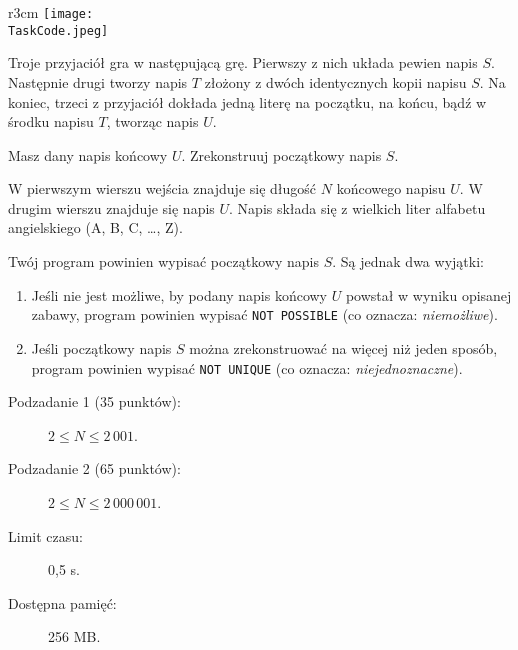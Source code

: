 \documentclass{boi2014-pl}
\renewcommand{\TaskCode}{friends}
\begin{document}
    \begin{wrapfigure}{r}{3cm}
		\texttt{[image: \\TaskCode.jpeg]}
	\end{wrapfigure}
    Troje przyjaciół gra w następującą grę.
    Pierwszy z nich układa pewien napis $S$.
    Następnie drugi tworzy napis $T$ złożony z dwóch identycznych kopii napisu $S$.
    Na koniec, trzeci z przyjaciół dokłada jedną literę na początku, na końcu, bądź w środku napisu $T$, tworząc napis $U$.

    \Task
    Masz dany napis końcowy $U$. Zrekonstruuj początkowy napis $S$.

    \Input
    W pierwszym wierszu wejścia znajduje się długość $N$ końcowego napisu $U$.
    W drugim wierszu znajduje się napis $U$.
    Napis składa się z wielkich liter alfabetu angielskiego (A, B, C, \ldots{}, Z).

    \Output
    Twój program powinien wypisać początkowy napis $S$.
    Są jednak dwa wyjątki:
    \begin{enumerate}
        \item Jeśli nie jest możliwe, by podany napis końcowy $U$ powstał w wyniku opisanej zabawy, program powinien wypisać {\tt NOT POSSIBLE}
          (co oznacza: \emph{niemożliwe}).
        \item Jeśli początkowy napis $S$ można zrekonstruować na więcej niż jeden sposób, program powinien wypisać {\tt NOT
          UNIQUE} (co oznacza: \emph{niejednoznaczne}).
    \end{enumerate}
    

    \Examples


    \Scoring

    \begin{description}
        \item[Podzadanie 1 (35 punktów):] $2 \le N \le 2\,001$.
        \item[Podzadanie 2 (65 punktów):] $2 \le N \le 2\,000\,001$.
    \end{description}

    \Constraints

    \begin{description}
        \item[Limit czasu:] 0,5 s.
        \item[Dostępna pamięć:] 256 MB.
    \end{description}
\end{document}
